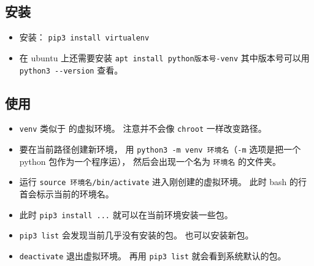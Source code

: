 
\begin{issues}
\issueDraft
\end{issues}


\subsection{安装}
\begin{itemize}
\item 安装： \verb`pip3 install virtualenv`
\item 在 ubuntu 上还需要安装 \verb`apt install python版本号-venv` 其中版本号可以用 \verb`python3 --version` 查看。
\end{itemize}

\subsection{使用}
\begin{itemize}
\item \verb`venv` 类似于  的虚拟环境。 注意并不会像 \verb`chroot` 一样改变路径。
\item 要在当前路径创建新环境， 用 \verb`python3 -m venv 环境名`（\verb`-m` 选项是把一个 python 包作为一个程序运）， 然后会出现一个名为 \verb`环境名` 的文件夹。
\item 运行 \verb`source 环境名/bin/activate` 进入刚创建的虚拟环境。 此时 bash 的行首会标示当前的环境名。
\item 此时 \verb`pip3 install ...` 就可以在当前环境安装一些包。
\item \verb`pip3 list` 会发现当前几乎没有安装的包。 也可以安装新包。
\item \verb`deactivate` 退出虚拟环境。 再用 \verb`pip3 list` 就会看到系统默认的包。
\end{itemize}
